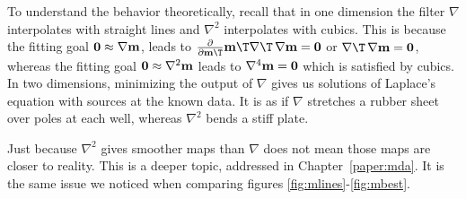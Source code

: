 
\par
To understand the behavior theoretically,
recall that in one dimension 
the filter $\nabla$ interpolates with straight lines
and $\nabla^2$ interpolates with cubics.
This is because the fitting goal
$\bold 0 \approx \nabla \bold m$,
leads to
$\frac{\partial }{\partial \bold m\T} \bold m\T\nabla\T\,\nabla \bold m = \bold 0$
or $\nabla\T\,\nabla \bold m = \bold 0$, whereas the fitting goal 
        $\bold 0 \approx \nabla^2 \bold m$
leads to
        $\nabla^4 \bold m = \bold 0$
which is satisfied by cubics.
In two dimensions, minimizing the output of $\nabla$
gives us solutions of Laplace's equation with sources at the known data.
It is as if $\nabla$ stretches a rubber sheet over poles at each well,
whereas $\nabla^2$ bends a stiff plate.
\par
Just because $\nabla^2$ gives smoother maps than  $\nabla$
does not mean those maps are closer to reality.
This is a deeper topic, addressed in Chapter~\ref{paper:mda}.
It is the same issue we noticed when comparing
figures \ref{fig:mlines}-\ref{fig:mbest}.

